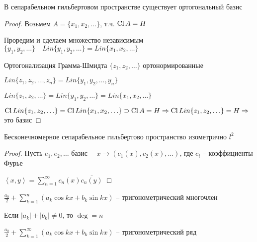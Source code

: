 \begin{theorem}\thmslashn 
	
	В сепарабельном гильбертовом пространстве существует ортогональный базис
	
\end{theorem}

\begin{proof}\thmslashn 
	
	Возьмем $A = \{x_1, x_2, \ldots\}$, т.ч. $\operatorname{Cl} A = H$
	
	Проредим и сделаем множество независимым $\{y_1, y_2, \ldots\}\quad Lin\{y_1, y_2, \ldots\} = Lin\{x_1, x_2, \ldots\}$
	
	Ортогонализация Грамма-Шмидта $\{z_1, z_2, \ldots\}$ ортонормированные
	
	$Lin \{z_1, z_2, \ldots, z_n\} = Lin \{y_1, y_2, \ldots , y_n\}$
	
	$Lin \{z_1, z_2, \ldots\} = Lin \{y_1, y_2, \ldots\} = Lin\{x_1, x_2, \ldots\}$
	
	$\operatorname{Cl} Lin \{z_1, z_2, \ldots\} = \operatorname{Cl} Lin\{x_1, x_2, \ldots\} \supset \operatorname{Cl} A = H \Rightarrow \operatorname{Cl} Lin \{z_1, z_2, \ldots\} = H \Rightarrow$ это базис
	
\end{proof}

\begin{theorem}\thmslashn 
	
	Бесконечномерное сепарабельное гильбертово пространство изометрично $l^2$

\end{theorem}

\begin{proof}\thmslashn 
	
	Пусть $e_1, e_2, \ldots$ базис $\quad x \to (c_1(x), c_2(x), \ldots)$, где $c_i$ -- коэффициенты Фурье
	
	$\left\langle x, y \right\rangle = \sum\limits_{n = 1}^{\infty} c_n(x)\bar{c_n(y)}$
	
\end{proof}

\begin{definition}\thmslashn
	
	$\frac{a_0}{2} + \sum\limits_{k =1}^{n}\left( a_k \cos kx + b_k\sin kx \right)$ -- тригонометрический многочлен
	
	Если $|a_k| + |b_k| \not = 0$, то $\deg = n$
	
\end{definition}


\begin{definition}\thmslashn
	
	$\frac{a_0}{2} + \sum\limits_{k =1}^{\infty}\left( a_k \cos kx + b_k\sin kx \right) $ -- тригонометрический ряд
	
\end{definition}

